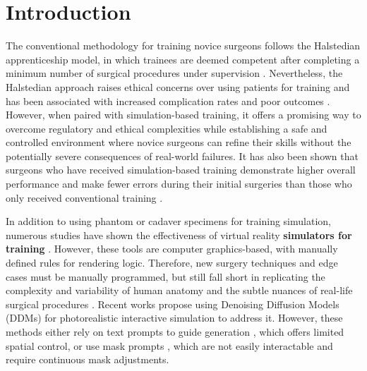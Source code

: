 \section{Introduction}
\label{sec:intro}


The conventional methodology for training novice surgeons follows the Halstedian apprenticeship model, in which trainees are deemed competent after completing a minimum number of surgical procedures under supervision \cite{lee2020systematic}. Nevertheless, the Halstedian approach raises ethical concerns over using patients for training and has been associated with increased complication rates and poor outcomes \cite{kwong2014long}. However, when paired with simulation-based training, it offers a promising way to overcome regulatory and ethical complexities while establishing a safe and controlled environment where novice surgeons can refine their skills without the potentially severe consequences of real-world failures. It has also been shown that surgeons who have received simulation-based training demonstrate higher overall performance and make fewer errors during their initial surgeries than those who only received conventional training \cite{thomsen2017operating}.

In addition to using phantom or cadaver specimens for training simulation, numerous studies have shown the effectiveness of virtual reality \textbf{simulators for training} \cite{staropoli2018surgical, thomsen2017operating}. However, these tools are computer graphics-based, with manually defined rules for rendering logic. Therefore, new surgery techniques and edge cases must be manually programmed, but still fall short in replicating the complexity and variability of human anatomy and the subtle nuances of real-life surgical procedures \cite{iliash2024interactive}. Recent works propose using Denoising Diffusion Models (DDMs) for photorealistic interactive simulation to address it. However, these methods either rely on text prompts to guide generation \cite{cho2024surgen}, which offers limited spatial control, or use mask prompts \cite{iliash2024interactive}, which are not easily interactable and require continuous mask adjustments.

